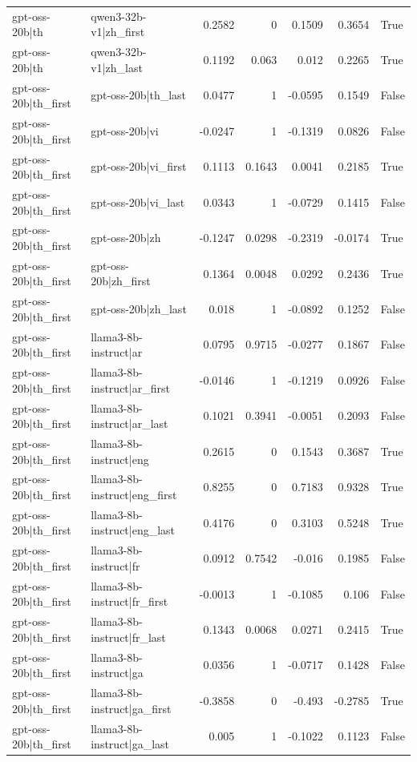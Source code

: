 \begin{table}
\begin{tabular}{l l r r r r l}
gpt-oss-20b|th & qwen3-32b-v1|zh_first & 0.2582 & 0 & 0.1509 & 0.3654 & True \\
gpt-oss-20b|th & qwen3-32b-v1|zh_last & 0.1192 & 0.063 & 0.012 & 0.2265 & True \\
gpt-oss-20b|th_first & gpt-oss-20b|th_last & 0.0477 & 1 & -0.0595 & 0.1549 & False \\
gpt-oss-20b|th_first & gpt-oss-20b|vi & -0.0247 & 1 & -0.1319 & 0.0826 & False \\
gpt-oss-20b|th_first & gpt-oss-20b|vi_first & 0.1113 & 0.1643 & 0.0041 & 0.2185 & True \\
gpt-oss-20b|th_first & gpt-oss-20b|vi_last & 0.0343 & 1 & -0.0729 & 0.1415 & False \\
gpt-oss-20b|th_first & gpt-oss-20b|zh & -0.1247 & 0.0298 & -0.2319 & -0.0174 & True \\
gpt-oss-20b|th_first & gpt-oss-20b|zh_first & 0.1364 & 0.0048 & 0.0292 & 0.2436 & True \\
gpt-oss-20b|th_first & gpt-oss-20b|zh_last & 0.018 & 1 & -0.0892 & 0.1252 & False \\
gpt-oss-20b|th_first & llama3-8b-instruct|ar & 0.0795 & 0.9715 & -0.0277 & 0.1867 & False \\
gpt-oss-20b|th_first & llama3-8b-instruct|ar_first & -0.0146 & 1 & -0.1219 & 0.0926 & False \\
gpt-oss-20b|th_first & llama3-8b-instruct|ar_last & 0.1021 & 0.3941 & -0.0051 & 0.2093 & False \\
gpt-oss-20b|th_first & llama3-8b-instruct|eng & 0.2615 & 0 & 0.1543 & 0.3687 & True \\
gpt-oss-20b|th_first & llama3-8b-instruct|eng_first & 0.8255 & 0 & 0.7183 & 0.9328 & True \\
gpt-oss-20b|th_first & llama3-8b-instruct|eng_last & 0.4176 & 0 & 0.3103 & 0.5248 & True \\
gpt-oss-20b|th_first & llama3-8b-instruct|fr & 0.0912 & 0.7542 & -0.016 & 0.1985 & False \\
gpt-oss-20b|th_first & llama3-8b-instruct|fr_first & -0.0013 & 1 & -0.1085 & 0.106 & False \\
gpt-oss-20b|th_first & llama3-8b-instruct|fr_last & 0.1343 & 0.0068 & 0.0271 & 0.2415 & True \\
gpt-oss-20b|th_first & llama3-8b-instruct|ga & 0.0356 & 1 & -0.0717 & 0.1428 & False \\
gpt-oss-20b|th_first & llama3-8b-instruct|ga_first & -0.3858 & 0 & -0.493 & -0.2785 & True \\
gpt-oss-20b|th_first & llama3-8b-instruct|ga_last & 0.005 & 1 & -0.1022 & 0.1123 & False \\

\end{tabular}
\end{table}
